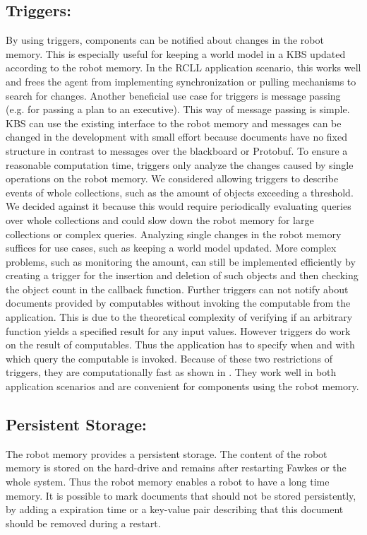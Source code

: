 \subsection{Triggers:}
By using triggers, components can be notified about changes
in the robot memory. This is especially useful for keeping a world
model in a KBS updated according to the robot memory. In the RCLL
application scenario, this works well and frees the agent from
implementing synchronization or pulling mechanisms to search for
changes. Another beneficial use case for triggers is message passing
(e.g. for passing a plan to an executive). This way of message passing
is simple. KBS can use the existing interface to the robot
memory and messages can be changed in the development with small
effort because documents have no fixed structure in contrast to
messages over the blackboard or Protobuf. To ensure a reasonable
computation time, triggers only analyze the changes caused by single
operations on the robot memory. We considered allowing triggers to
describe events of whole collections, such as the amount of objects
exceeding a threshold. We decided against it because this would
require periodically evaluating queries over whole collections and
could slow down the robot memory for large collections or complex
queries. Analyzing single changes in the robot memory suffices for
use cases, such as keeping a world model updated. 
More complex problems, such as monitoring the amount, can still be
implemented efficiently by creating a trigger for the insertion and
deletion of such objects and then checking the object count in the
callback function. Further triggers can not notify about documents
provided by computables without invoking the computable from the
application. This is due to the theoretical complexity of verifying if
an arbitrary function yields a specified result for any input
values. However triggers do work on the result of computables. Thus
the application has to specify when and with which query the computable
is invoked. Because of these two restrictions of triggers, they are
computationally fast as shown in . They
work well in both application scenarios and are convenient for
components using the robot memory.

\subsection{Persistent Storage:}
The robot memory provides a persistent storage. The content of the
robot memory is stored on the hard-drive and remains after restarting
Fawkes or the whole system. Thus the robot memory enables a robot to
have a long time memory. It is possible to mark documents that should
not be stored persistently, by adding a expiration time or a key-value
pair describing that this document should be removed during a restart.

